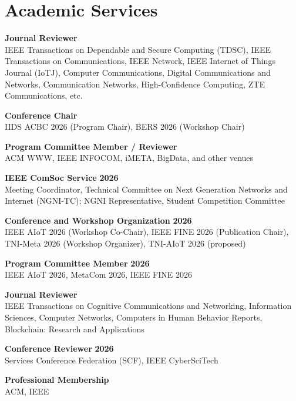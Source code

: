 \documentclass{resume}
\begin{document}
\section{Academic Services} 
\begin{content}
    {\bf Journal Reviewer} \hfill {\bf} \\
    IEEE Transactions on Dependable and Secure Computing (TDSC), IEEE Transactions on Communications, IEEE Network, IEEE Internet of Things Journal (IoTJ), Computer Communications, Digital Communications and Networks, Communication Networks, High-Confidence Computing, ZTE Communications, etc.
    
    {\bf Conference Chair} \hfill {\bf} \\
    IIDS ACBC 2026 (Program Chair), BERS 2026 (Workshop Chair)

    {\bf Program Committee Member / Reviewer} \hfill {\bf} \\
    ACM WWW, IEEE INFOCOM, iMETA, BigData, and other venues

    {\bf IEEE ComSoc Service} \hfill {\bf 2026} \\
    Meeting Coordinator, Technical Committee on Next Generation Networks and Internet (NGNI-TC); NGNI Representative, Student Competition Committee

    {\bf Conference and Workshop Organization} \hfill {\bf 2026} \\
    IEEE AIoT 2026 (Workshop Co-Chair), IEEE FINE 2026 (Publication Chair), TNI-Meta 2026 (Workshop Organizer), TNI-AIoT 2026 (proposed)

    {\bf Program Committee Member} \hfill {\bf 2026} \\
    IEEE AIoT 2026, MetaCom 2026, IEEE FINE 2026

    {\bf Journal Reviewer} \hfill {\bf} \\
    IEEE Transactions on Cognitive Communications and Networking, Information Sciences, Computer Networks, Computers in Human Behavior Reports, Blockchain: Research and Applications

    {\bf Conference Reviewer} \hfill {\bf 2026} \\
    Services Conference Federation (SCF), IEEE CyberSciTech

    {\bf Professional Membership} \hfill {\bf} \\
    ACM, IEEE
\sectionlineskip
\end{content}

\end{document}
